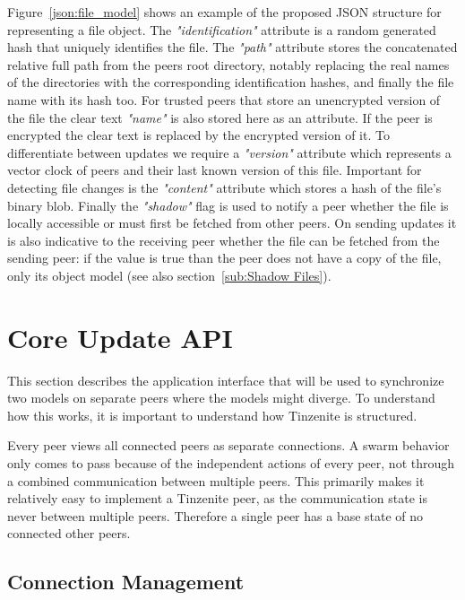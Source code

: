 Figure~\ref{json:file_model} shows an example of the proposed JSON structure for representing a file object.
The \textit{"identification"} attribute is a random generated hash that uniquely identifies the file.
The \textit{"path"} attribute stores the concatenated relative full path from the peers root directory, notably replacing the real names of the directories with the corresponding identification hashes, and finally the file name with its hash too.
For trusted peers that store an unencrypted version of the file the clear text \textit{"name"} is also stored here as an attribute.
If the peer is encrypted the clear text is replaced by the encrypted version of it.
To differentiate between updates we require a \textit{"version"} attribute which represents a vector clock of peers and their last known version of this file.
Important for detecting file changes is the \textit{"content"} attribute which stores a hash of the file's binary blob.
Finally the \textit{"shadow"} flag is used to notify a peer whether the file is locally accessible or must first be fetched from other peers.
On sending updates it is also indicative to the receiving peer whether the file can be fetched from the sending peer: if the value is true than the peer does not have a copy of the file, only its object model (see also section~\ref{sub:Shadow Files}).

\section{Core Update API}
\label{sec:Core Update API}

This section describes the application interface that will be used to synchronize two models on separate peers where the models might diverge.
To understand how this works, it is important to understand how Tinzenite is structured.

Every peer views all connected peers as separate connections.
A swarm behavior only comes to pass because of the independent actions of every peer, not through a combined communication between multiple peers.
This primarily makes it relatively easy to implement a Tinzenite peer, as the communication state is never between multiple peers.
Therefore a single peer has a base state of no connected other peers.

\subsection{Connection Management}
\label{sec:conn_management}

